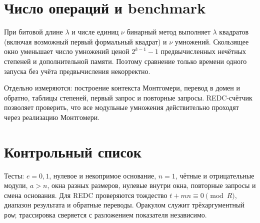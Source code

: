 \documentclass[12pt]{ca-capstone}
\begin{document}
\section{Число операций и benchmark}
При битовой длине $\lambda$ и числе единиц $\nu$ бинарный метод выполняет $\lambda$ квадратов
(включая возможный первый формальный квадрат) и $\nu$ умножений. Скользящее окно уменьшает число
умножений ценой $2^{k-1}-1$ предвычисленных нечётных степеней и дополнительной памяти. Поэтому
сравнение только времени одного запуска без учёта предвычисления некорректно.

Отдельно измеряются: построение контекста Монтгомери, перевод в домен и обратно, таблицы степеней,
первый запрос и повторные запросы. REDC-счётчик позволяет проверить, что все модульные умножения
действительно проходят через реализацию Монтгомери.

\clearpage
\section{Контрольный список}
Тесты: $e=0,1$, нулевое и некопримое основание, $n=1$, чётные и отрицательные модули, $a>n$,
окна разных размеров, нулевые внутри окна, повторные запросы и смена основания. Для REDC
проверяются тождество $t+mn\equiv0\pmod R$, диапазон результата и обратные переводы. Оракулом
служит трёхаргументный \texttt{pow}; трассировка сверяется с разложением показателя независимо.

\end{document}
